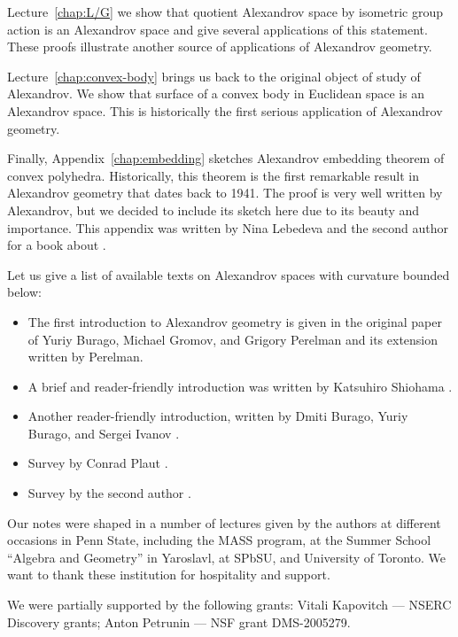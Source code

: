 Lecture~\ref{chap:L/G} we show that quotient Alexandrov space by isometric group action is an Alexandrov space and give several applications of this statement.
These proofs illustrate another source of applications of Alexandrov geometry.

Lecture~\ref{chap:convex-body} brings us back to the original object of study of Alexandrov.
We show that surface of a convex body in Euclidean space is an Alexandrov space.
This is historically the first serious application of Alexandrov geometry.

Finally, Appendix~\ref{chap:embedding} sketches Alexandrov embedding theorem of convex polyhedra.
Historically, this theorem is the first remarkable result in Alexandrov geometry that dates back to 1941.
The proof is very well written by Alexandrov, but we decided to include its sketch here due to its beauty and importance.
This appendix was written by Nina Lebedeva and the second author for a book about .

Let us give a list of available texts on Alexandrov spaces with curvature bounded below: 
\begin{itemize}
\item The first introduction to Alexandrov geometry is given in the original paper of Yuriy Burago, Michael Gromov, and Grigory Perelman \cite{burago-gromov-perelman} 
and its extension \cite{perelman1991} written by Perelman.
\item A brief and reader-friendly introduction was written by Katsuhiro Shiohama \cite[Sections 1--8]{shiohama}.
\item Another reader-friendly introduction, written by Dmiti Burago, Yuriy
Burago, and Sergei Ivanov \cite[Chapter 10]{burago-burago-ivanov}.
\item Survey by Conrad Plaut \cite{plaut:survey}.
\item Survey by the second author \cite{petrunin:survey}.
\end{itemize}

Our notes were shaped in a number of lectures given by the authors
at different occasions in Penn State, including the MASS program,
at the Summer School ``Algebra and Geometry'' in Yaroslavl,
at SPbSU,
and University of Toronto.
We want to thank these institution for hospitality and support.

We were partially supported by the following grants:
Vitali Kapovitch ---   NSERC Discovery grants;
Anton Petrunin --- 
NSF grant DMS-2005279. %


